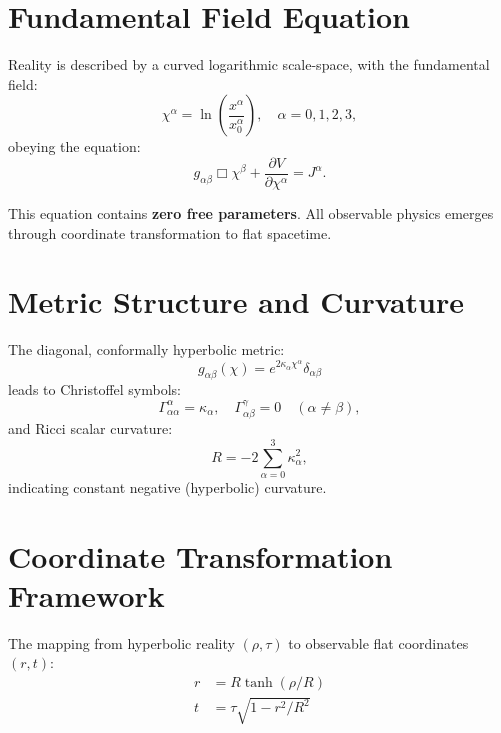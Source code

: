 \documentclass[12pt]{article}
\begin{document}
\section{Fundamental Field Equation}

Reality is described by a curved logarithmic scale-space, with the fundamental field:
\begin{equation}
\chi^\alpha = \ln\left(\frac{x^\alpha}{x_0^\alpha}\right), \quad \alpha = 0,1,2,3,
\end{equation}
obeying the equation:
\begin{equation}
g_{\alpha \beta} \Box \chi^{\beta} + \frac{\partial V}{\partial \chi^{\alpha}} = J^{\alpha}.
\label{eq:fundamental}
\end{equation}

This equation contains \textbf{zero free parameters}. All observable physics emerges through coordinate transformation to flat spacetime.

\section{Metric Structure and Curvature}

The diagonal, conformally hyperbolic metric:
\begin{equation}
g_{\alpha\beta}(\chi) = e^{2\kappa_\alpha \chi^\alpha} \delta_{\alpha\beta}
\end{equation}
leads to Christoffel symbols:
\begin{equation}
\Gamma^\alpha_{\alpha\alpha} = \kappa_\alpha, \quad \Gamma^\gamma_{\alpha\beta} = 0 \quad (\alpha \ne \beta),
\end{equation}
and Ricci scalar curvature:
\begin{equation}
R = -2 \sum_{\alpha=0}^3 \kappa_\alpha^2,
\end{equation}
indicating constant negative (hyperbolic) curvature.

\section{Coordinate Transformation Framework}

The mapping from hyperbolic reality $(\rho,\tau)$ to observable flat coordinates $(r,t)$:
\begin{align}
r &= R \tanh(\rho/R) \label{eq:radial_transform}\\
t &= \tau \sqrt{1 - r^2/R^2} \label{eq:time_transform}
\end{align}
\end{document}
